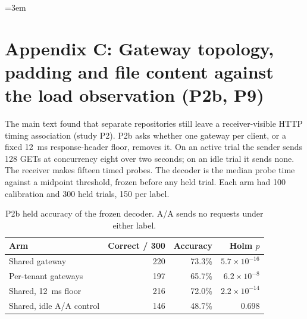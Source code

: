 
{\emergencystretch=3em
\section*{Appendix C: Gateway topology, padding and file content against the load observation (P2b, P9)}

The main text found that separate repositories still leave a receiver-visible HTTP timing association (study P2).
P2b asks whether one gateway per client, or a fixed 12~ms response-header floor, removes it.
On an active trial the sender sends 128 GETs at concurrency eight over two seconds; on an idle trial it sends none.
The receiver makes fifteen timed probes.
The decoder is the median probe time against a midpoint threshold, frozen before any held trial.
Each arm had 100 calibration and 300 held trials, 150 per label.

\begin{table}[!ht]\centering\small
\begin{tabular}{lrrr}\toprule
Arm & Correct / 300 & Accuracy & Holm $p$ \\\midrule
Shared gateway & 220 & 73.3\% & $5.7\times10^{-16}$ \\
Per-tenant gateways & 197 & 65.7\% & $6.2\times10^{-8}$ \\
Shared, 12~ms floor & 216 & 72.0\% & $2.2\times10^{-14}$ \\
Shared, idle A/A control & 146 & 48.7\% & 0.698 \\\bottomrule
\end{tabular}
\caption{P2b held accuracy of the frozen decoder. A/A sends no requests under either label.}
\end{table}

}
